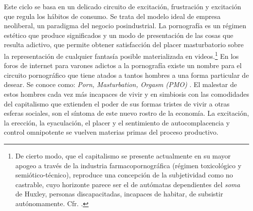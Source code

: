 Este ciclo se basa en un delicado circuito de excitación, frustración y excitación que regula los hábitos de consumo. Se trata del modelo ideal de empresa neoliberal, un paradigma del negocio posindustrial. La pornografía es un régimen estético que produce significados y un modo de presentación de las cosas que resulta adictivo, que permite obtener satisfacción del placer masturbatorio sobre la representación de cualquier fantasía posible materializada en videos.\footnote{De cierto modo, que el capitalismo se presente actualmente en su mayor apogeo a través de la industria farmacopornográfica (régimen toxicológico y semiótico-técnico), reproduce una concepción de la subjetividad como no castrable, cuyo horizonte parece ser el de autómatas dependientes del \emph{soma} de Huxley, personas discapacitadas, incapaces de habitar, de subsistir autónomamente. Cfr. \autocite{preciadoTestoYonqui2008}.} En los foros de internet para varones adictos a la pornografía existe un nombre para el circuito pornográfico que tiene atados a tantos hombres a una forma particular de desear. Se conoce como: \emph{Porn, Masturbation, Orgasm (PMO)} \autocite{NoFapDonLie}. El malestar de estos hombres cada vez más incapaces de vivir y en simbiosis con las comodidades del capitalismo que extienden el poder de sus formas tristes de vivir a otras esferas sociales, son el síntoma de este nuevo rostro de la economía. La excitación, la erección, la eyaculación, el placer y el sentimiento de autocomplacencia y control omnipotente se vuelven materias primas del proceso productivo.

